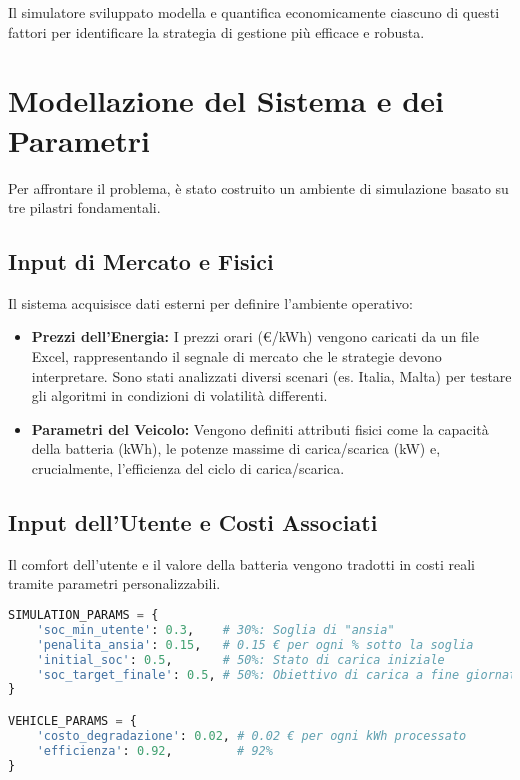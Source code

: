 \documentclass[11pt, a4paper]{article}
\begin{document}
Il simulatore sviluppato modella e quantifica economicamente ciascuno di questi fattori per identificare la strategia di gestione più efficace e robusta.

\section{Modellazione del Sistema e dei Parametri}

Per affrontare il problema, è stato costruito un ambiente di simulazione basato su tre pilastri fondamentali.

\subsection{Input di Mercato e Fisici}
Il sistema acquisisce dati esterni per definire l'ambiente operativo:
\begin{itemize}
    \item \textbf{Prezzi dell'Energia:} I prezzi orari (€/kWh) vengono caricati da un file Excel, rappresentando il segnale di mercato che le strategie devono interpretare. Sono stati analizzati diversi scenari (es. Italia, Malta) per testare gli algoritmi in condizioni di volatilità differenti.
    \item \textbf{Parametri del Veicolo:} Vengono definiti attributi fisici come la capacità della batteria (kWh), le potenze massime di carica/scarica (kW) e, crucialmente, l'efficienza del ciclo di carica/scarica.
\end{itemize}

\subsection{Input dell'Utente e Costi Associati}
Il comfort dell'utente e il valore della batteria vengono tradotti in costi reali tramite parametri personalizzabili.

\begin{lstlisting}[language=Python, caption=Esempio di parametri di simulazione e costi., label=code:params]
SIMULATION_PARAMS = {
    'soc_min_utente': 0.3,    # 30%: Soglia di "ansia"
    'penalita_ansia': 0.15,   # 0.15 € per ogni % sotto la soglia
    'initial_soc': 0.5,       # 50%: Stato di carica iniziale
    'soc_target_finale': 0.5, # 50%: Obiettivo di carica a fine giornata
}

VEHICLE_PARAMS = {
    'costo_degradazione': 0.02, # 0.02 € per ogni kWh processato
    'efficienza': 0.92,         # 92%
}
\end{lstlisting}
\end{document}
